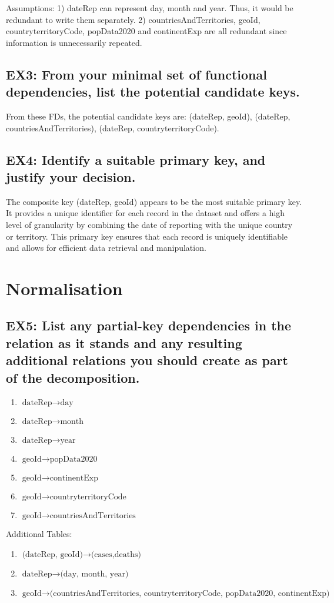 \documentclass{article}
\begin{document}
Assumptions: 1) dateRep can represent day, month and year. Thus, it would be redundant to write them separately. 2) countriesAndTerritories, geoId, countryterritoryCode, popData2020 and continentExp are all redundant since information is unnecessarily repeated.
    
\subsection*{EX3: From your minimal set of functional dependencies, list the potential candidate keys.}
From these FDs, the potential candidate keys are:
(dateRep, geoId), (dateRep, countriesAndTerritories), (dateRep, countryterritoryCode).

\subsection*{EX4: Identify a suitable primary key, and justify your decision.}
The composite key (dateRep, geoId) appears to be the most suitable primary key. It provides a unique identifier for each record in the dataset and offers a high level of granularity by combining the date of reporting with the unique country or territory. This primary key ensures that each record is uniquely identifiable and allows for efficient data retrieval and manipulation.

\section{Normalisation}
\subsection*{EX5: List any partial-key dependencies in the relation as it stands and any resulting additional relations you should create as part of the decomposition.}
\begin{enumerate}
    \item \(\text{{dateRep}}\rightarrow \text{{day}}\)
    \item \(\text{{dateRep}}\rightarrow \text{{month}}\)
    \item \(\text{{dateRep}}\rightarrow \text{{year}}\)
    \item \( \text{{geoId}} \rightarrow \text{{popData2020}} \)
    \item \( \text{{geoId}} \rightarrow \text{{continentExp}} \)
    \item \( \text{{geoId}} \rightarrow \text{{countryterritoryCode}} \)
    \item \( \text{{geoId}} \rightarrow \text{{countriesAndTerritories}} \)
\end{enumerate} 
Additional Tables: 
\begin{enumerate}
    \item \(\text{{(dateRep, geoId)}}\rightarrow \text{{(cases,deaths)}}\)
    \item \(\text{{dateRep}}\rightarrow \text{{(day, month, year)}}\)
    \item \(\text{{geoId}}\rightarrow \text{{(countriesAndTerritories, countryterritoryCode, popData2020, continentExp)}}\)
\end{enumerate} 
\end{document}
